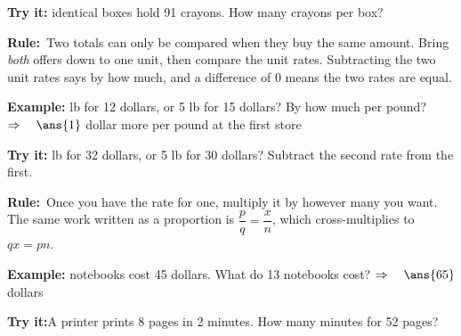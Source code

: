 \documentclass[12pt]{article}
\begin{document}
\begin{tryitbox}\textbf{Try it:} identical boxes hold 91 crayons.
How many crayons per box?\\[2pt]
\end{tryitbox}


\begin{formulabox}\textbf{Rule:}\ Two totals can only be compared when they buy
the same amount. Bring \emph{both} offers down to one unit, then compare the
unit rates. Subtracting the two unit rates says by how much, and a difference
of $0$ means the two rates are equal.
\end{formulabox}

\begin{examplebox}\textbf{Example:} lb for 12 dollars, or 5 lb for
15 dollars? By how much per pound?
$\Rightarrow\quad \ans{1}$ dollar more per pound at the first store
\end{examplebox}

\begin{tryitbox}\textbf{Try it:} lb for 32 dollars, or 5 lb for
30 dollars? Subtract the second rate from the first.\\[2pt]
\end{tryitbox}


\begin{formulabox}\textbf{Rule:}\ Once you have the rate for one, multiply it
by however many you want. The same work written as a proportion is
$\dfrac{p}{q} = \dfrac{x}{n}$, which cross-multiplies to $qx = pn$.
\end{formulabox}

\begin{examplebox}\textbf{Example:} notebooks cost 45 dollars. What do
13 notebooks cost?
$\Rightarrow\quad \ans{65}$ dollars
\end{examplebox}

\begin{tryitbox}\textbf{Try it:}\quad A printer prints 8 pages in 2 minutes.
How many minutes for 52 pages?\\[2pt]
\end{tryitbox}
\end{document}
